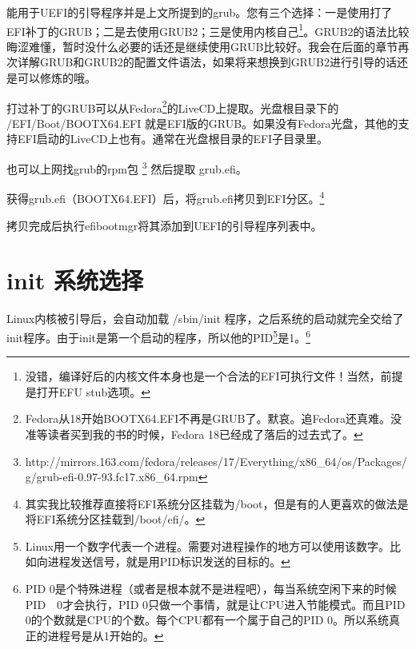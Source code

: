 \documentclass[amstex,twoside]{ctexbook}
\begin{document}
能用于UEFI的引导程序并是上文所提到的grub。您有三个选择：一是使用打了EFI补丁的GRUB；二是去使用GRUB2；三是使用内核自己\footnote{没错，编译好后的内核文件本身也是一个合法的EFI可执行文件！当然，前提是打开EFU stub选项。}。GRUB2的语法比较晦涩难懂，暂时没什么必要的话还是继续使用GRUB比较好。我会在后面的章节再次详解GRUB和GRUB2的配置文件语法，如果将来想换到GRUB2进行引导的话还是可以修炼的哦。

打过补丁的GRUB可以从Fedora\footnote{Fedora从18开始BOOTX64.EFI不再是GRUB了。默哀。追Fedora还真难。没准等读者买到我的书的时候，Fedora 18已经成了落后的过去式了。}的LiveCD上提取。光盘根目录下的 /EFI/Boot/BOOTX64.EFI 就是EFI版的GRUB。如果没有Fedora光盘，其他的支持EFI启动的LiveCD上也有。通常在光盘根目录的EFI子目录里。

也可以上网找grub的rpm包
\footnote{%
http://mirrors.163.com/fedora/releases/17/Everything/x86\_64/os/Packages/g/grub-efi-0.97-93.fc17.x86\_64.rpm
}
然后提取 grub.efi。

获得grub.efi（BOOTX64.EFI）后，将grub.efi拷贝到EFI分区。\footnote{其实我比较推荐直接将EFI系统分区挂载为/boot，但是有的人更喜欢的做法是将EFI系统分区挂载到/boot/efi/。}

拷贝完成后执行efibootmgr将其添加到UEFI的引导程序列表中。

\section{init 系统选择}

Linux内核被引导后，会自动加载 /sbin/init 程序，之后系统的启动就完全交给了init程序。由于init是第一个启动的程序，所以他的PID\footnote{Linux用一个数字代表一个进程。需要对进程操作的地方可以使用该数字。比如向进程发送信号，就是用PID标识发送的目标的。}是1。\footnote{PID 0是个特殊进程（或者是根本就不是进程吧），每当系统空闲下来的时候PID　0才会执行，PID 0只做一个事情，就是让CPU进入节能模式。而且PID　0的个数就是CPU的个数。每个CPU都有一个属于自己的PID 0。所以系统真正的进程号是从1开始的。}
\end{document}
